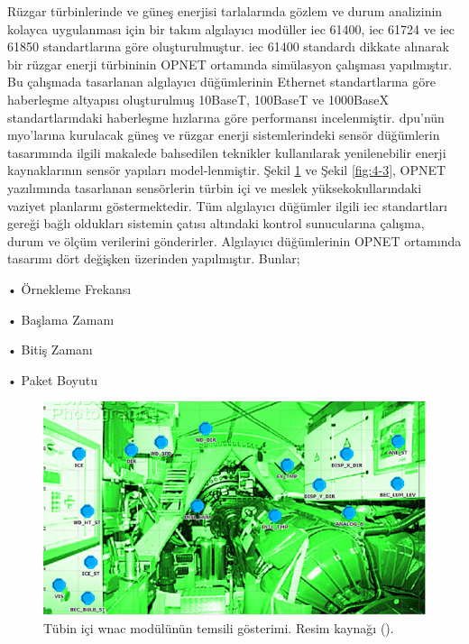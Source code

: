Rüzgar türbinlerinde ve güneş enerjisi tarlalarında gözlem ve durum analizinin kolayca uygulanması için bir takım algılayıcı modüller \gls{iec} 61400, \gls{iec} 61724 ve \gls{iec} 61850 standartlarına göre oluşturulmuştur\cite{ahmed2011simulation}. \gls{iec} 61400 standardı dikkate alınarak bir rüzgar enerji türbininin OPNET ortamında simülasyon çalışması yapılmıştır. Bu çalışmada tasarlanan algılayıcı düğümlerinin Ethernet standartlarına göre haberleşme altyapısı oluşturulmuş 10BaseT, 100BaseT ve 1000BaseX standartlarındaki haberleşme hızlarına göre performansı incelenmiştir. \gls{dpu}’nün \gls{myo}'larına kurulacak güneş ve rüzgar enerji sistemlerindeki sensör düğümlerin tasarımında ilgili makalede bahsedilen teknikler kullanılarak yenilenebilir enerji kaynaklarının sensör yapıları model-lenmiştir. Şekil \ref{fig:4-2} ve Şekil \ref{fig:4-3}, OPNET yazılımında tasarlanan sensörlerin türbin içi ve meslek yüksekokullarındaki vaziyet planlarını göstermektedir. Tüm algılayıcı düğümler ilgili \gls{iec} standartları gereği bağlı oldukları sistemin çatısı altındaki kontrol sunucularına çalışma, durum ve ölçüm verilerini gönderirler. Algılayıcı düğümlerinin OPNET ortamında tasarımı dört değişken üzerinden yapılmıştır\cite{ahmed2011simulation}. Bunlar;

•	Örnekleme Frekansı

•	Başlama Zamanı

•	Bitiş Zamanı

•	Paket Boyutu

\begin{figure}[htbp]
\centerline{\includegraphics[width=\columnwidth]{Resim/Sekil4-2.png}}
\caption{Tübin içi \gls{wnac} modülünün temsili gösterimi. Resim kaynağı (\protect{}).}
\label{fig:4-2}
\end{figure}


